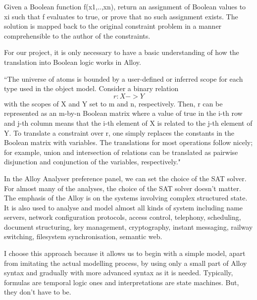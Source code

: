\documentclass[a4paper,12pt]{extarticle}
\begin{document}
{Given a Boolean function f(x1,..,xn), return an assignment of Boolean values to xi such that f evaluates to true, or prove that no such assignment exists. The solution is mapped back to the original constraint problem in a manner comprehensible to the author of the constraints. \cite{Yeung2005}

 For our project, it is only necessary to have a basic understanding of how the translation into Boolean logic works in Alloy. 
 
``The universe of atoms is bounded by a user-defined or inferred scope for each type used in the object model. Consider a binary relation 
\begin{equation}
r : X->Y
\end{equation} with the scopes of X and Y set to m and n, respectively. Then, r can be represented as an m-by-n Boolean matrix where a value of true in the i-th row and j-th column means that the i-th element of X is related to the j-th element of Y. To translate a constraint over r, one simply replaces the constants in the Boolean matrix with variables. The translations for most operations follow nicely; for example, union and intersection of relations can be translated as pairwise disjunction and conjunction of the variables, respectively." \cite{Yeung2005}

In the Alloy Analyser preference panel, we can set the choice of the SAT solver. For almost many of the analyses, the choice of the SAT solver doesn't matter. The emphasis of the Alloy is on the systems involving complex structured state. It is also used to analyse and model almost all kinds of system including name servers, network configuration protocols, access control, telephony, scheduling, document structuring, key management, cryptography, instant messaging, railway switching, filesystem synchronisation, semantic web. 

I choose this approach because it allows us to begin with a simple model, apart from imitating the actual modelling process, by using only a small part of Alloy syntax and gradually with more advanced syntax as it is needed. Typically, formulas are temporal logic ones and interpretations are state machines. But, they don't have to be.}
\end{document}

